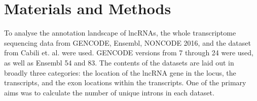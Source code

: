 \documentclass[ncrna,article,submit,moreauthors,pdftex,10pt,a4paper]{mdpi}
\begin{document}
\begin{figure}[ht]
 \centering 
 \label{F07}
 \label{F08}
\end{figure}


\section{Materials and Methods}

To analyse the annotation landscape of lncRNAs, the whole transcriptome sequencing data from GENCODE, Ensembl, NONCODE 2016, 
and the dataset from Cabili et. al. were used. GENCODE versions from 7 through 24 were used, as well as Ensembl 54 and 83.
The contents of the datasets are laid out in broadly three categories: the location of the lncRNA gene in the locus, 
the transcripts, and the exon locations within the transcripts. One of the primary aims was to calculate
the number of unique introns in each dataset. 
\end{document}
